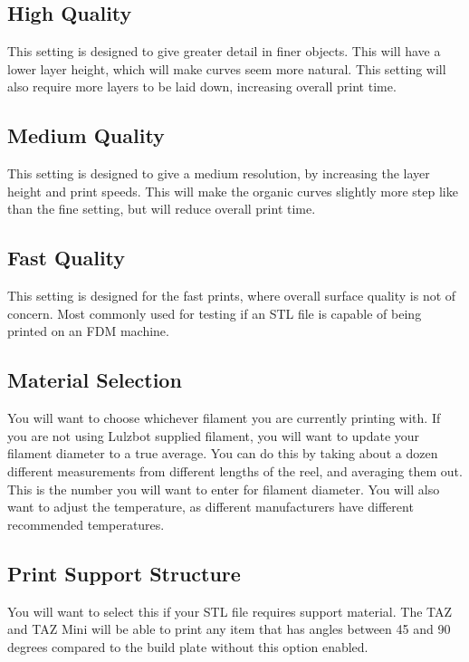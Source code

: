 \subsection{High Quality}

This setting is designed to give greater detail in finer objects. This will have a lower layer height, which will make curves seem more natural. This setting will also require more layers to be laid down, increasing overall print time.

\subsection{Medium Quality}

This setting is designed to give a medium resolution, by increasing the layer height and print speeds. This will make the organic curves slightly more step like than the fine setting, but will reduce overall print time. 

\subsection{Fast Quality}

This setting is designed for the fast prints, where overall surface quality is not of concern. Most commonly used for testing if an STL file is capable of being printed on an FDM machine.

\subsection{Material Selection}

You will want to choose whichever filament you are currently printing with. If you are not using Lulzbot supplied filament, you will want to update your filament diameter to a true average. You can do this by taking about a dozen different measurements from different lengths of the reel, and averaging them out. This is the number you will want to enter for filament diameter. You will also want to adjust the temperature, as different manufacturers have different recommended temperatures.

\subsection{Print Support Structure}

You will want to select this if your STL file requires support material. The TAZ and TAZ Mini will be able to print any item that has angles between 45 and 90 degrees compared to the build plate without this option enabled.

